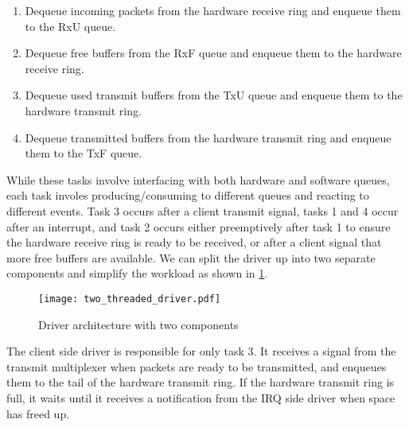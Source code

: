 \begin{enumerate}
    \item Dequeue incoming packets from the hardware receive ring and enqueue them to the RxU queue.
    \item Dequeue free buffers from the RxF queue and enqueue them to the hardware receive ring.
    \item Dequeue used transmit buffers from the TxU queue and enqueue them to the hardware transmit ring.
    \item Dequeue transmitted buffers from the hardware transmit ring and enqueue them to the TxF queue. 
\end{enumerate}

While these tasks involve interfacing with both hardware and software queues, each task involes
producing/consuming to different queues and reacting to different events. Task 3 occurs after a client transmit signal, 
tasks 1 and 4 occur after an interrupt, and task 2 occurs either preemptively after task 1 to ensure the hardware receive
ring is ready to be received, or after a client signal that more free buffers are available. We can split the driver up into
two separate components and simplify the workload as shown in \ref{f:two_threaded_driver}.

\begin{figure}[h]
    \centering
    \texttt{[image: two\_threaded\_driver.pdf]}
    \caption{Driver architecture with two components}
    \label{f:two_threaded_driver}
\end{figure}

The client side driver is responsible for only task 3. It receives a signal from the transmit multiplexer when packets are ready
to be transmitted, and enqueues them to the tail of the hardware transmit ring. If the hardware transmit ring is full, it waits 
until it receives a notification from the IRQ side driver when space has freed up. 

